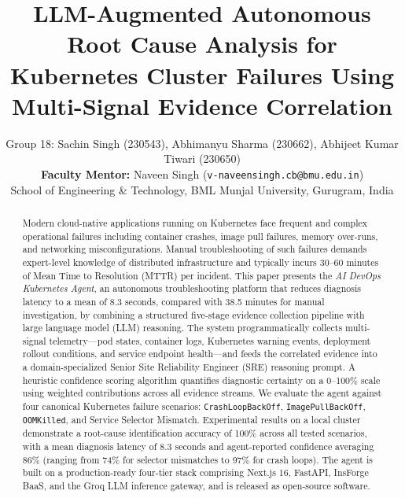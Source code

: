 \documentclass[12pt,onecolumn,draftclsnofoot]{IEEEtran}
\begin{document}
\title{LLM-Augmented Autonomous Root Cause Analysis for Kubernetes Cluster Failures Using Multi-Signal Evidence Correlation}

\author{%
  Group 18: Sachin Singh (230543), Abhimanyu Sharma (230662), Abhijeet Kumar Tiwari (230650)\\
  \textbf{Faculty Mentor:} Naveen Singh (\texttt{v-naveensingh.cb@bmu.edu.in})\\
  School of Engineering \& Technology, BML Munjal University, Gurugram, India
}

\maketitle

\begin{abstract}
Modern cloud-native applications running on Kubernetes face frequent and complex operational failures including container crashes, image pull failures, memory over-runs, and networking misconfigurations. Manual troubleshooting of such failures demands expert-level knowledge of distributed infrastructure and typically incurs 30--60 minutes of Mean Time to Resolution (MTTR) per incident. This paper presents the \textit{AI DevOps Kubernetes Agent}, an autonomous troubleshooting platform that reduces diagnosis latency to a mean of 8.3 seconds, compared with 38.5 minutes for manual investigation, by combining a structured five-stage evidence collection pipeline with large language model (LLM) reasoning. The system programmatically collects multi-signal telemetry—pod states, container logs, Kubernetes warning events, deployment rollout conditions, and service endpoint health—and feeds the correlated evidence into a domain-specialized Senior Site Reliability Engineer (SRE) reasoning prompt. A heuristic confidence scoring algorithm quantifies diagnostic certainty on a 0--100\% scale using weighted contributions across all evidence streams. We evaluate the agent against four canonical Kubernetes failure scenarios: \texttt{CrashLoopBackOff}, \texttt{ImagePullBackOff}, \texttt{OOMKilled}, and Service Selector Mismatch. Experimental results on a local cluster demonstrate a root-cause identification accuracy of 100\% across all tested scenarios, with a mean diagnosis latency of 8.3 seconds and agent-reported confidence averaging 86\% (ranging from 74\% for selector mismatches to 97\% for crash loops). The agent is built on a production-ready four-tier stack comprising Next.js 16, FastAPI, InsForge BaaS, and the Groq LLM inference gateway, and is released as open-source software.
\end{abstract}
\end{document}

